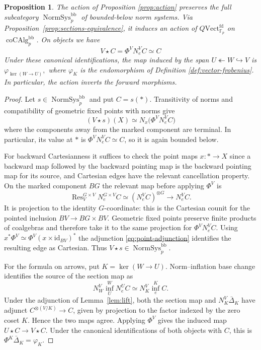 \documentclass[11pt,a4paper]{article}
\newtheorem{prop}[thm]{Proposition}
\theoremstyle{definition}
\newcommand{\Fp}{\mathbb F_p}
\newcommand{\Res}{\operatorname{Res}}
\newcommand{\coAlg}{\operatorname{coCAlg}}
\newcommand{\NormSys}{\operatorname{NormSys}}
\newcommand{\id}{\mathrm{id}}
\newcommand{\infl}{\operatorname{inf}}
\newcommand{\Vect}{\mathrm{Vect}^{\mathrm{fd}}_{\Fp}}
\begin{document}
\begin{prop}\label{prop:Q}
The action of Proposition \ref{prop:action} preserves the full subcategory
$\NormSys_p^{\mathrm{bb}}$ of bounded-below norm systems.
Via Proposition~\ref{prop:sections-equivalence}, it induces an action of $Q\Vect$  on $\coAlg_p^{\mathrm{bb}}$. On objects we have 
\[
V \star C=\Phi^V N_e^V C \simeq C
\]
Under these canonical identifications, the map induced by the span 
$
U\twoheadleftarrow W\hookrightarrow V$ is 
$\varphi_{\ker(W\to U)},
$
where $\varphi_K$ is the endomorphism of Definition \ref{def:vector-frobenius}.
In particular, the action inverts the forward morphisms.
\end{prop}
\begin{proof}
Let $s\in\NormSys_p^{\mathrm{bb}}$ and put $C=s(*)$.
Transitivity of norms and compatibility of geometric fixed points with norms give
\[
 (V\star s)(X) \simeq N_x\bigl(\Phi^V N_e^VC\bigr)
\]
where  the components away from the marked component are terminal.
In particular, its value at $*$ is $\Phi^V N_e^VC\simeq C$,
so it is again bounded below.

For backward Cartesianness it suffices to check the point maps
$x:*\to X$ since  a backward map followed by the backward pointing
map is the backward pointing map for its source, and Cartesian edges
have the relevant cancellation property. On the marked
component $BG$ the relevant map before applying $\Phi^V$ is
\[
 \Res_V^{G\times V}N_e^{G\times V}C
 \simeq (N_e^VC)^{\otimes G}\longrightarrow N_e^VC.
\]
It is projection to the identity $G$-coordinate: this is the
Cartesian counit for the pointed inclusion $BV\to BG\times BV$.
Geometric fixed points preserve finite products of coalgebras and
therefore take it to the same projection for $\Phi^VN_e^VC$.
Using
$x^*\Phi^V\simeq\Phi^V(x\times\id_{BV})^*$ the adjunction
\eqref{eq:point-adjunction} identifies the resulting edge as
Cartesian. Thus $V\star s\in\NormSys_p^{\mathrm{bb}}$.

For the formula on arrows, put $K=\ker(W\to U)$. Norm--inflation
base change identifies the source of the section map as
\[
 N_W^V\infl_U^W N_e^UC\simeq N_K^V\infl_e^K C.
\]
Under the adjunction of Lemma~\ref{lem:lift}, both the section map
and $N_K^V\bar{\Delta}_K$ have adjunct
$C^{\otimes(V/K)}\to C$, given by projection to the factor
indexed by the zero coset $K$. Hence the two maps agree.
Applying $\Phi^V$ gives the induced map $U\star C\to V\star C$.
Under the canonical identifications of both objects with $C$,
this is $\Phi^K\bar{\Delta}_K=\varphi_K$.
\end{proof}
\end{document}
